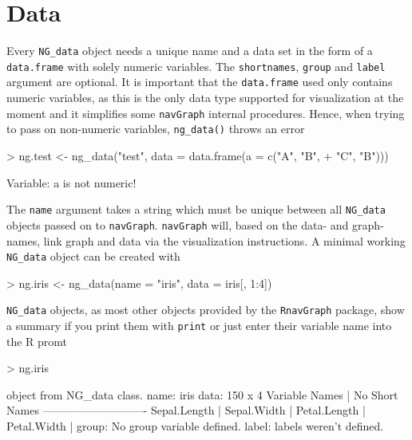 \documentclass[12pt,oneside,titlepage,letter]{article}
\begin{document}
\section{Data}
Every \texttt{NG\_data} object needs a unique name and a data set in the form of a \texttt{data.frame} with solely numeric variables. The \texttt{shortnames}, \texttt{group} and \texttt{label} argument are optional. It is important that the \texttt{data.frame} used only contains numeric variables, as this is the only data type supported for visualization at the moment and it simplifies some \texttt{navGraph} internal procedures. Hence, when trying to pass on non-numeric variables, \texttt{ng\_data()} throws an error
\begin{Schunk}
\begin{Sinput}
> ng.test <- ng_data("test", data = data.frame(a = c("A", "B", 
+     "C", "B")))
\end{Sinput}
\end{Schunk}
\begin{Schunk}
\begin{Soutput}
Variable: a is not numeric!
\end{Soutput}
\end{Schunk}


The \texttt{name} argument takes a string which must be unique between all \texttt{NG\_data} objects passed on to \texttt{navGraph}. \texttt{navGraph} will, based on the data- and graph- names, link graph and data via the visualization instructions. A minimal working \texttt{NG\_data} object can be created with
\begin{Schunk}
\begin{Sinput}
> ng.iris <- ng_data(name = "iris", data = iris[, 1:4])
\end{Sinput}
\end{Schunk}
\texttt{NG\_data} objects, as most other objects provided by the \texttt{RnavGraph} package, show a summary if you print them with \texttt{print} or just enter their variable name into the R promt
\begin{Schunk}
\begin{Sinput}
> ng.iris
\end{Sinput}
\begin{Soutput}
object from NG_data class.
  name: iris 
  data: 150 x 4 
    Variable Names | No Short Names
    ----------------------------
    Sepal.Length   | 
    Sepal.Width    | 
    Petal.Length   | 
    Petal.Width    | 
  group:  No group variable defined.
  label: labels weren't defined.
\end{Soutput}
\end{Schunk}
\end{document}

